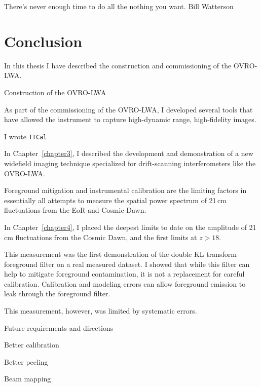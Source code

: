 \cleartoevenpage

\myepigraph
{There's never enough time to do all the nothing you want.}
{Bill Watterson}

\chapter{Conclusion}
\label{chapter5}

In this thesis I have described the construction and commissioning of the OVRO-LWA.

Construction of the OVRO-LWA

As part of the commissioning of the OVRO-LWA, I developed several tools that have allowed the
instrument to capture high-dynamic range, high-fidelity images.

I wrote \texttt{TTCal}

In Chapter~\ref{chapter3}, I described the development and demonstration of a new widefield imaging
technique specialized for drift-scanning interferometers like the OVRO-LWA.

Foreground mitigation and instrumental calibration are the limiting factors in essentially all
attempts to measure the spatial power spectrum of 21\,cm fluctuations from the EoR and Cosmic Dawn.

In Chapter~\ref{chapter4}, I placed the deepest limits to date on the amplitude of 21\,cm
fluctuations from the Cosmic Dawn, and the first limits at $z > 18$.

This measurement was the first demonstration of the double KL transform foreground filter on a real
measured dataset. I showed that while this filter can help to mitigate foreground contamination, it
is not a replacement for careful calibration. Calibration and modeling errors can allow foreground
emission to leak through the foreground filter.

This measurement, however, was limited by systematic errors.

Future requirements and directions

Better calibration

Better peeling

Beam mapping

